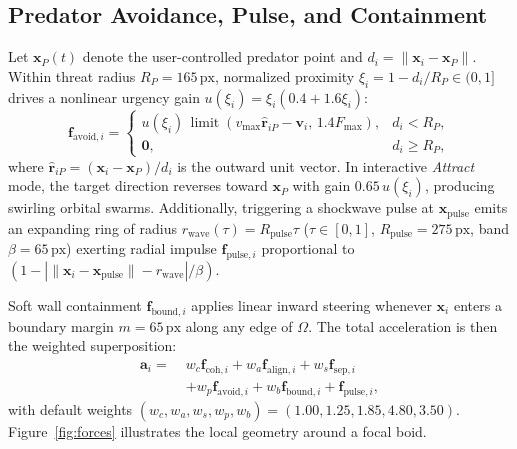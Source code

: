 \documentclass[10pt,twocolumn]{article}
\begin{document}
\subsection{Predator Avoidance, Pulse, and Containment}
Let $\mathbf{x}_P(t)$ denote the user-controlled predator point and $d_i = \|\mathbf{x}_i - \mathbf{x}_P\|$. Within threat radius $R_P = 165\,\text{px}$, normalized proximity $\xi_i = 1 - d_i / R_P \in (0, 1]$ drives a nonlinear urgency gain $u(\xi_i) = \xi_i (0.4 + 1.6\xi_i)$:
\begin{equation}
    \mathbf{f}_{\text{avoid}, i} =
    \begin{cases}
        u(\xi_i)\,\operatorname{limit}\!\left(v_{\max}\hat{\mathbf{r}}_{iP} - \mathbf{v}_i,\, 1.4 F_{\max}\right), & d_i < R_P, \\
        \mathbf{0}, & d_i \ge R_P,
    \end{cases}
\end{equation}
where $\hat{\mathbf{r}}_{iP} = (\mathbf{x}_i - \mathbf{x}_P)/d_i$ is the outward unit vector. In interactive \emph{Attract} mode, the target direction reverses toward $\mathbf{x}_P$ with gain $0.65\,u(\xi_i)$, producing swirling orbital swarms. Additionally, triggering a shockwave pulse at $\mathbf{x}_{\text{pulse}}$ emits an expanding ring of radius $r_{\text{wave}}(\tau) = R_{\text{pulse}}\tau$ ($\tau \in [0,1]$, $R_{\text{pulse}} = 275\,\text{px}$, band $\beta = 65\,\text{px}$) exerting radial impulse $\mathbf{f}_{\text{pulse}, i}$ proportional to $(1 - |\|\mathbf{x}_i - \mathbf{x}_{\text{pulse}}\| - r_{\text{wave}}|/\beta)$.

Soft wall containment $\mathbf{f}_{\text{bound}, i}$ applies linear inward steering whenever $\mathbf{x}_i$ enters a boundary margin $m = 65\,\text{px}$ along any edge of $\Omega$. The total acceleration is then the weighted superposition:
\begin{equation}
\begin{aligned}
    \mathbf{a}_i =\;& w_c \mathbf{f}_{\text{coh}, i} + w_a \mathbf{f}_{\text{align}, i} + w_s \mathbf{f}_{\text{sep}, i} \\
                    & + w_p \mathbf{f}_{\text{avoid}, i} + w_b \mathbf{f}_{\text{bound}, i} + \mathbf{f}_{\text{pulse}, i},
\end{aligned}
\end{equation}
with default weights $(w_c, w_a, w_s, w_p, w_b) = (1.00, 1.25, 1.85, 4.80, 3.50)$. Figure~\ref{fig:forces} illustrates the local geometry around a focal boid.
\end{document}
